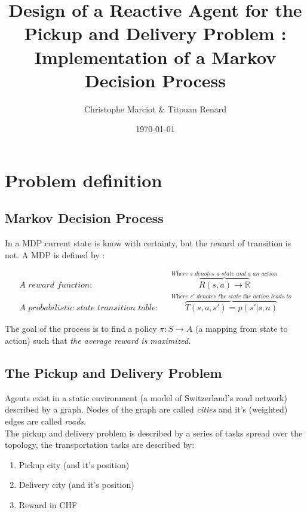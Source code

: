 \documentclass[11pt]{article}
\title{Design of a Reactive Agent for the Pickup and Delivery Problem : Implementation of a Markov Decision Process}
\date{\today}
\author{Christophe Marciot \& Titouan Renard}
\begin{document}
\maketitle	

\section{Problem definition}

\subsection{Markov Decision Process}

In a MDP current state is know with certainty, but the reward of transition is not. A MDP is defined by : 

\begin{align*}
    \textit{A reward function:} && \overbrace{R(s,a) \rightarrow \mathbb{R}}^{\textit{Where $s$ denotes a state and $a$ an action}} \\
    \textit{A probabilistic state transition table:} && \overbrace{T(s,a,s') = p(s'|s,a)}^{\textit{Where $s'$ denotes the state the action leads to}}
\end{align*}

The goal of the process is to find a policy $\pi : S \rightarrow A$ (a mapping from state to action) such that \textit{the average reward is maximized}.

\subsection{The Pickup and Delivery Problem}

Agents exist in a static environment (a model of Switzerland's road network) described by a graph. Nodes of the graph are called \textit{cities} and it's (weighted) edges are called \textit{roads}. \\

The pickup and delivery problem is described by a series of tasks spread over the topology, the transportation tasks are described by: 

\begin{enumerate}
    \item Pickup city (and it's position)
    \item Delivery city (and it's position)
    \item Reward in CHF
\end{enumerate}

\newpage
\end{document}
